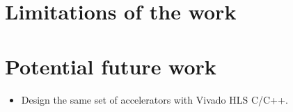 \documentclass{sig-alternate}
\begin{document}
\section{Limitations of the work}


\section{Potential future work}
\begin{itemize}
    \item Design the same set of accelerators with Vivado HLS C/C++.
\end{itemize}



{\small
\balance
%


}





\end{document}
